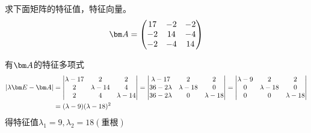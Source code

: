 \begin{example}
    求下面矩阵的特征值，特征向量。
    \[
        \mat{A} =
        \begin{pmatrix}
            17 & -2 & -2 \\
            -2 & 14 & -4 \\
            -2 & -4 & 14
        \end{pmatrix}
    \]
\end{example}
\begin{solution}
    有$\mat{A}$的特征多项式
    \begin{align*}
        |\lambda \mat{E} - \mat{A}| & =
        \begin{vmatrix}
            \lambda-17 & 2            & 2           \\
            2          & \lambda - 14 & 4           \\
            2          & 4            & \lambda -14
        \end{vmatrix}
        =
        \begin{vmatrix}
            \lambda-17  & 2            & 2           \\
            36-2\lambda & \lambda - 18 & 0           \\
            36-2\lambda & 0            & \lambda -18
        \end{vmatrix}
        =
        \begin{vmatrix}
            \lambda-9 & 2            & 2           \\
            0         & \lambda - 18 & 0           \\
            0         & 0            & \lambda -18
        \end{vmatrix}                                \\
                                    & = (\lambda-9)(\lambda-18)^2
    \end{align*}
    得特征值$\lambda_1 = 9, \lambda_2 = 18(\text{重根})$


\end{solution}
